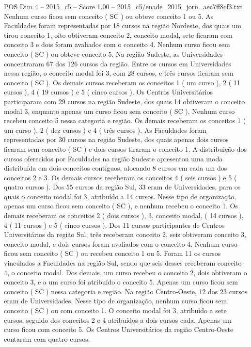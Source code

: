 \begin{textsample}{POS Dim 4 – 2015\_c5 – Score 1.00 – 2015\_c5/enade\_2015\_jorn\_aec7ff8cf3.txt}
Nenhum curso ficou sem conceito ( SC ) ou obteve conceito 1 ou 5.
As Faculdades foram representadas por 18 cursos na região Nordeste, dos quais um tirou conceito 1, oito obtiveram conceito 2, conceito modal, sete ficaram com conceito 3 e dois foram avaliados com o conceito 4.
Nenhum curso ficou sem conceito ( SC ) ou obteve conceito 5.
Na região Sudeste, as Universidades concentraram 67 dos 126 cursos da região.
Entre os cursos em Universidades nessa região, o conceito modal foi 3, com 28 cursos, e três cursos ficaram sem conceito ( SC ).
Os demais cursos receberam os conceitos 1 ( um curso ), 2 ( 11 cursos ), 4 ( 19 cursos ) e 5 ( cinco cursos ).
Os Centros Universitários participaram com 29 cursos na região Sudeste, dos quais 14 obtiveram o conceito modal 3, enquanto apenas um curso ficou sem conceito ( SC ).
Nenhum curso recebeu conceito 5 nessa categoria e região.
Os demais receberam os conceitos 1 ( um curso ), 2 ( dez cursos ) e 4 ( três cursos ).
As Faculdades foram representadas por 30 cursos na região Sudeste, dos quais apenas dois cursos ficaram sem conceito ( SC ) e dois cursos tiraram o conceito 1.
A distribuição dos cursos oferecidos por Faculdades na região Sudeste apresentou uma moda distribuída em dois conceitos contíguos, alocando 8 cursos em cada um dos conceitos 2 e 3.
Os demais cursos receberam os conceitos 4 ( seis cursos ) e 5 ( quatro cursos ).
Dos 55 cursos da região Sul, 33 eram de Universidades, para os quais o conceito modal foi 3, atribuído a 14 cursos.
Nesse tipo de organização, apenas um curso ficou sem conceito ( SC ), e nenhum recebeu o conceito 1.
Os demais receberam os conceitos 2 ( dois cursos ), 3, conceito modal, ( 14 cursos ), 4 ( 11 cursos ) e 5 ( cinco cursos ).
Dos 11 cursos participantes de Centros Universitários da região Sul, três receberam conceito 2, seis obtiveram conceito 3, conceito modal, e dois cursos foram avaliados com o conceito 4.
Nenhum curso ficou sem conceito ( SC ) ou recebeu conceito 1 ou 5.
Foram 11 os cursos vinculados a Faculdades na região Sul, sendo que seis desses receberam conceito 4, o conceito modal.
Dos demais, um curso recebeu o conceito 2, dois obtiveram o conceito 3, e a um curso foi atribuído o conceito 5.
Apenas um curso ficou sem conceito ( SC ) nessa categoria e região.
Na região Centro-Oeste, 12 dos 23 cursos eram de Universidades.
Nesse tipo de organização, nenhum curso ficou sem conceito ( SC ) ou com conceito 1.
O conceito modal foi 3, atribuído a sete cursos, seguido dos conceitos 2 e 4 atribuídos a dois cursos cada.
Apenas um curso ficou com conceito 5.
Os Centros Universitários da região Centro-Oeste contaram com quatro cursos.

\end{textsample}
